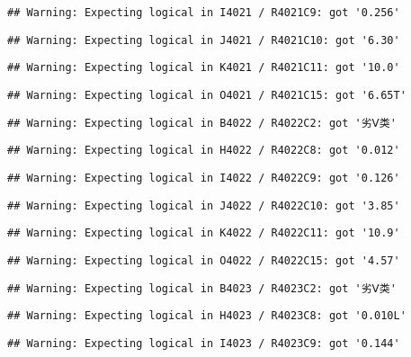 \documentclass[
]{article}
\begin{document}
\begin{verbatim}
## Warning: Expecting logical in I4021 / R4021C9: got '0.256'
\end{verbatim}

\begin{verbatim}
## Warning: Expecting logical in J4021 / R4021C10: got '6.30'
\end{verbatim}

\begin{verbatim}
## Warning: Expecting logical in K4021 / R4021C11: got '10.0'
\end{verbatim}

\begin{verbatim}
## Warning: Expecting logical in O4021 / R4021C15: got '6.65T'
\end{verbatim}

\begin{verbatim}
## Warning: Expecting logical in B4022 / R4022C2: got '劣Ⅴ类'
\end{verbatim}

\begin{verbatim}
## Warning: Expecting logical in H4022 / R4022C8: got '0.012'
\end{verbatim}

\begin{verbatim}
## Warning: Expecting logical in I4022 / R4022C9: got '0.126'
\end{verbatim}

\begin{verbatim}
## Warning: Expecting logical in J4022 / R4022C10: got '3.85'
\end{verbatim}

\begin{verbatim}
## Warning: Expecting logical in K4022 / R4022C11: got '10.9'
\end{verbatim}

\begin{verbatim}
## Warning: Expecting logical in O4022 / R4022C15: got '4.57'
\end{verbatim}

\begin{verbatim}
## Warning: Expecting logical in B4023 / R4023C2: got '劣Ⅴ类'
\end{verbatim}

\begin{verbatim}
## Warning: Expecting logical in H4023 / R4023C8: got '0.010L'
\end{verbatim}

\begin{verbatim}
## Warning: Expecting logical in I4023 / R4023C9: got '0.144'
\end{verbatim}
\end{document}
